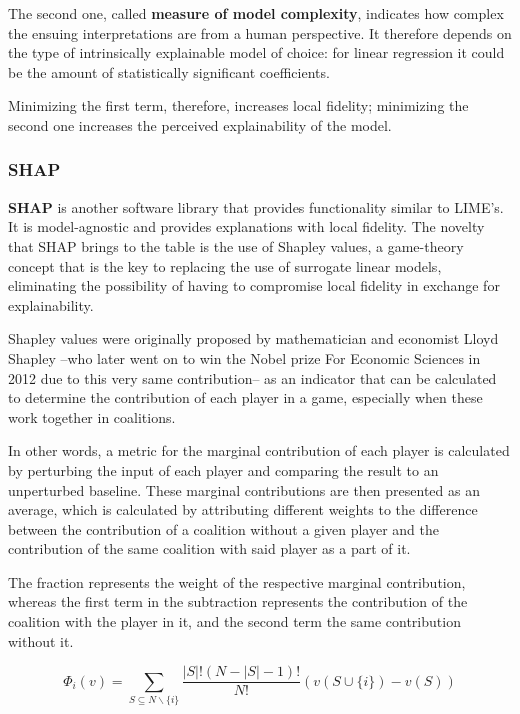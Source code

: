 The second one, called \textbf{measure of model complexity}, indicates how complex the ensuing interpretations are from a human perspective. It therefore depends on the type of intrinsically explainable model of choice: for linear regression it could be the amount of statistically significant coefficients.

Minimizing the first term, therefore, increases local fidelity; minimizing the second one increases the perceived explainability of the model. 

\subsubsection{SHAP}
\textbf{SHAP} is another software library that provides functionality similar to LIME’s. It is model-agnostic and provides explanations with local fidelity. 
The novelty that SHAP brings to the table is the use of Shapley values, a game-theory concept that is the key to replacing the use of surrogate linear models, eliminating the possibility of having to compromise local fidelity in exchange for explainability. 

Shapley values were originally proposed by mathematician and economist Lloyd Shapley \autocite{RM-670-PR}–who later went on to win the Nobel prize For Economic Sciences in 2012 due to this very same contribution– as an indicator that can be calculated to determine the contribution of each player in a game, especially when these work together in coalitions. 

In other words, a metric for the marginal contribution of each player is calculated by perturbing the input of each player and comparing the result to an unperturbed baseline. These marginal contributions are then presented as an average, which is calculated by attributing different weights to the difference between the contribution of a coalition without a given player and the contribution of the same coalition with said player as a part of it.

The fraction represents the weight of the respective marginal contribution, whereas the first term in the subtraction represents the contribution of the coalition with the player in it, and the second term the same contribution without it. 

\begin{equation} 
    \Phi_{i}(v)=\sum_{S \subseteq N \backslash\{i\}} \frac{|S| !(N-|S|-1) !}{N !}(v(S \cup\{i\})-v(S))
    \label{LongdavidEquation}
\end{equation}

